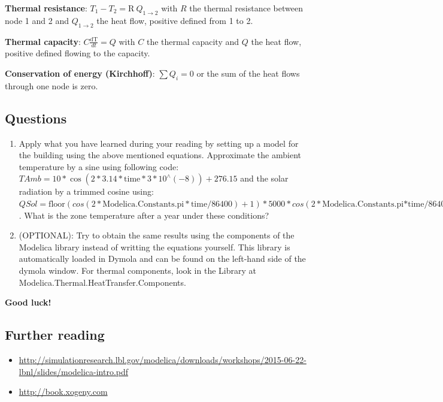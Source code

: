 \documentclass[10pt,a4paper]{article}
\begin{document}
\textbf{Thermal resistance}: $T_1 - T_2 = \text{R} \ Q_{1 \rightarrow 2} $ with $R$ the thermal resistance between node 1 and 2 and $Q_{1\rightarrow 2}$ the heat flow, positive defined from 1 to 2.

\textbf{Thermal capacity}: $C \frac{\text{dT}}{dt} = Q$ with $C$ the thermal capacity and $Q$ the heat flow, positive defined flowing to the capacity.

\textbf{Conservation of energy (Kirchhoff)}: $ \sum Q_i = 0$ or the sum of the heat flows through one node is zero.

\subsection*{Questions}

\begin{enumerate}
\item Apply what you have learned during your reading by setting up a model for the building using the above mentioned equations. Approximate the ambient temperature by a sine using following code: $TAmb = 10*\cos(2*3.14*\text{time}*3*10^\wedge(-8)) + 276.15$ and the solar radiation by a trimmed cosine using: $QSol = \text{floor}(cos(2*\text{Modelica.Constants.pi}*\text{time} / 86400) + 1) * 5000 * cos(2*\text{Modelica.Constants.pi*time} / 86400)$. What is the zone temperature after a year under these conditions?
\item (OPTIONAL): Try to obtain the same results using the components of the Modelica library instead of writting the equations yourself. This library is automatically loaded in Dymola and can be found on the left-hand side of the dymola window. For thermal components, look in the Library at Modelica.Thermal.HeatTransfer.Components.   \linebreak[10]
\end{enumerate}

\begin{center}
 \textbf{Good luck!}
\end{center}

\subsection*{Further reading}
\begin{itemize}
	\item \url{http://simulationresearch.lbl.gov/modelica/downloads/workshops/2015-06-22-lbnl/slides/modelica-intro.pdf}
	\item \url{http://book.xogeny.com}
\end{itemize}
\end{document}
